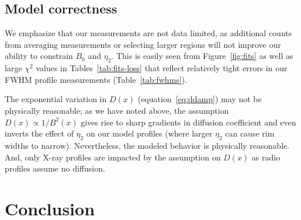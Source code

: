 \documentclass[manuscript]{aastex}  %
\newcommand*{\mt}{\mathrm}
\newcommand*{\Ecut}{E_{\mt{cut}}}
\newcommand*{\Bmin}{B_{\mt{min}}}
\begin{document}

\subsection{Model correctness}

We emphasize that our measurements are not data limited, as additional counts
from averaging measurements or selecting larger regions will not improve our
ability to constrain $B_0$ and $\eta_2$.  This is easily seen from
Figure~\ref{fig:fits} as well as large $\chi^2$ values in
Tables~\ref{tab:fits-loss} that reflect relatively tight errors in our FWHM
profile measurements (Table~\ref{tab:fwhms}).

The exponential variation in $D(x)$ (equation~\eqref{eq:ddamp}) may not be
physically reasonable; as we have noted above, the assumption $D(x)
\propto 1 / B^2(x)$ gives rise to sharp gradients in diffusion coefficient and
even inverts the effect of $\eta_2$ on our model profiles (where larger
$\eta_2$ can cause rim widths to narrow).  Nevertheless, the modeled behavior
is physically reasonable.  And, only X-ray profiles are impacted by the
assumption on $D(x)$ as radio profiles assume no diffusion.




\section{Conclusion}
\end{document}
